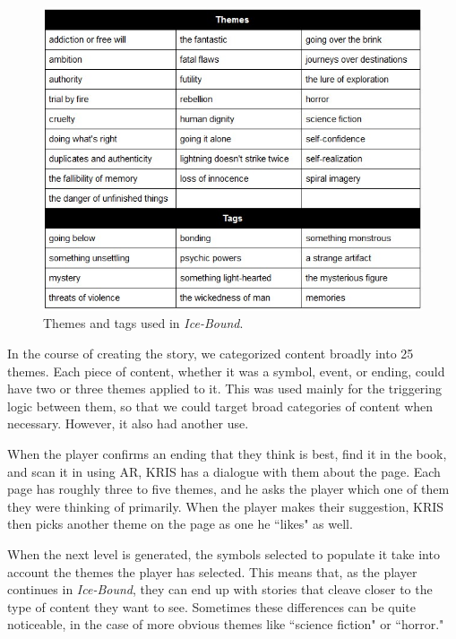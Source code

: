 \begin{figure}
    \centering
    \includegraphics[width=\textwidth]{figures/2-Ice-Bound/themes-and-tags.jpg}
    \caption{Themes and tags used in \textit{Ice-Bound}.}
    \label{fig:themes-and-tags}
\end{figure}


In the course of creating the story, we categorized content broadly into 25 themes. Each piece of content, whether it was a symbol, event, or ending, could have two or three themes applied to it. This was used mainly for the triggering logic between them, so that we could target broad categories of content when necessary. However, it also had another use.

When the player confirms an ending that they think is best, find it in the book, and scan it in using AR, KRIS has a dialogue with them about the page. Each page has roughly three to five themes, and he asks the player which one of them they were thinking of primarily. When the player makes their suggestion, KRIS then picks another theme on the page as one he ``likes" as well.

When the next level is generated, the symbols selected to populate it take into account the themes the player has selected. This means that, as the player continues in \textit{Ice-Bound}, they can end up with stories that cleave closer to the type of content they want to see. Sometimes these differences can be quite noticeable, in the case of more obvious themes like ``science fiction" or ``horror."

